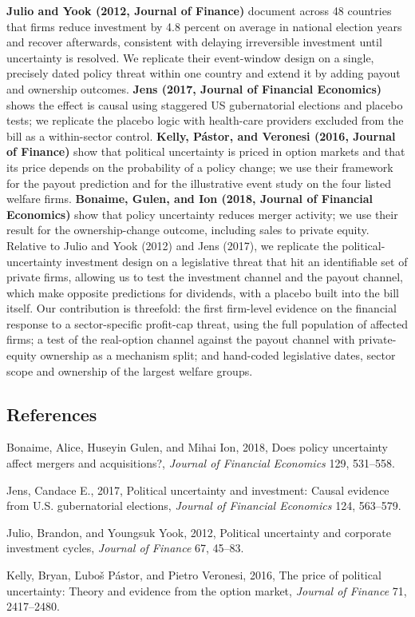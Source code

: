 \documentclass[12pt,a4paper]{article}
\newenvironment{refs}{\begin{list}{}{\setlength{\leftmargin}{1.5em}\setlength{\itemindent}{-1.5em}\setlength{\itemsep}{1pt}}}{\end{list}}
\begin{document}
\textbf{Julio and Yook (2012, Journal of Finance)} document across 48 countries that firms reduce investment by 4.8 percent on average in national election years and recover afterwards, consistent with delaying irreversible investment until uncertainty is resolved. We replicate their event-window design on a single, precisely dated policy threat within one country and extend it by adding payout and ownership outcomes. \textbf{Jens (2017, Journal of Financial Economics)} shows the effect is causal using staggered US gubernatorial elections and placebo tests; we replicate the placebo logic with health-care providers excluded from the bill as a within-sector control. \textbf{Kelly, P\'astor, and Veronesi (2016, Journal of Finance)} show that political uncertainty is priced in option markets and that its price depends on the probability of a policy change; we use their framework for the payout prediction and for the illustrative event study on the four listed welfare firms. \textbf{Bonaime, Gulen, and Ion (2018, Journal of Financial Economics)} show that policy uncertainty reduces merger activity; we use their result for the ownership-change outcome, including sales to private equity. Relative to Julio and Yook (2012) and Jens (2017), we replicate the political-uncertainty investment design on a legislative threat that hit an identifiable set of private firms, allowing us to test the investment channel and the payout channel, which make opposite predictions for dividends, with a placebo built into the bill itself. Our contribution is threefold: the first firm-level evidence on the financial response to a sector-specific profit-cap threat, using the full population of affected firms; a test of the real-option channel against the payout channel with private-equity ownership as a mechanism split; and hand-coded legislative dates, sector scope and ownership of the largest welfare groups.

\subsection*{References}
\begin{refs}
\item Bonaime, Alice, Huseyin Gulen, and Mihai Ion, 2018, Does policy uncertainty affect mergers and acquisitions?, \emph{Journal of Financial Economics} 129, 531--558.
\item Jens, Candace E., 2017, Political uncertainty and investment: Causal evidence from U.S. gubernatorial elections, \emph{Journal of Financial Economics} 124, 563--579.
\item Julio, Brandon, and Youngsuk Yook, 2012, Political uncertainty and corporate investment cycles, \emph{Journal of Finance} 67, 45--83.
\item Kelly, Bryan, \v{L}ubo\v{s} P\'astor, and Pietro Veronesi, 2016, The price of political uncertainty: Theory and evidence from the option market, \emph{Journal of Finance} 71, 2417--2480.
\end{refs}
\end{document}
